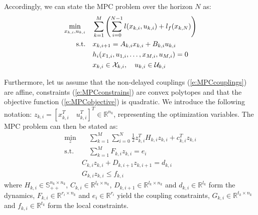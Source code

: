 Accordingly, we can state the MPC problem over the horizon $N$ as:
\begin{subequations}
\begin{align}
\min_{x_{k,i}, u_{k,i}} & \quad \sum_{k=1}^{M} \left( \sum_{i=0}^{N-1} \mathnormal{l}(x_{k,i}, u_{k,i}) + \mathnormal{l}_f(x_{k,N}) \right) \label{e:MPCobjective} \\
\text{s.t.} & \quad x_{k,i+1} = A_{k,i}x_{k,i} + B_{k,i}u_{k,i} \\
& \quad h_i(x_{1,i}, u_{1,i}, \dots, x_{M,i}, u_{M,i}) = 0 \label{e:MPCcouplings} \\
& \quad x_{k,i} \in \mathcal{X}_{k,i}, \quad u_{k,i} \in \mathcal{U}_{k,i} \label{e:MPCconstrains}
\end{align}
\end{subequations}

Furthermore, let us assume that the non-delayed couplings (\ref{e:MPCcouplings}) are affine, constraints (\ref{e:MPCconstrains}) are convex polytopes and that the objective function (\ref{e:MPCobjective}) is quadratic. We introduce the following notation: $z_{k,i} = [x_{k,i}^T \quad u_{k,i}^T]^T \in \mathbb{R}^{n_{k}}$, representing the optimization variables. The MPC problem can then be stated as:
\begin{subequations}
\label{e:problem}
\begin{align}
\min_z & \quad \sum_{k=1}^{M} \sum_{i=0}^N \frac{1}{2}z_{k,i}^TH_{k,i}z_{k,i} + c_{k,i}^Tz_{k,i} \label{e:1} \\
\text{s.t.} & \quad \sum_{k=1}^{M} F_{k,i}z_{k,i} = e_i \label{e:CoupConstControl} \\
& C_{k,i}z_{k,i} + D_{k,i+1}z_{k,i+1} = d_{k,i}  \label{e:dynamics} \\
& G_{k,i}z_{k,i} \leq f_{k,i}
\end{align}
\end{subequations}
where $H_{k,i} \in \mathbb{S}_{++}^{n_{k} \times n_{k}}$, $C_{k,i} \in \mathbb{R}^{l_{k} \times n_{k}}$, $D_{k,i+1} \in \mathbb{R}^{l_{k} \times n_{k}}$ and $d_{k,i} \in \mathbb{R}^{l_{k}}$ form the dynamics, $F_{k,i} \in \mathbb{R}^{r_{i} \times n_{k}}$ and $e_i \in \mathbb{R}^{r_i}$ yield the coupling constraints, $G_{k,i} \in \mathbb{R}^{t_{k} \times n_{k}}$ and $f_{k,i} \in \mathbb{R}^{t_{k}}$ form the local constraints.

